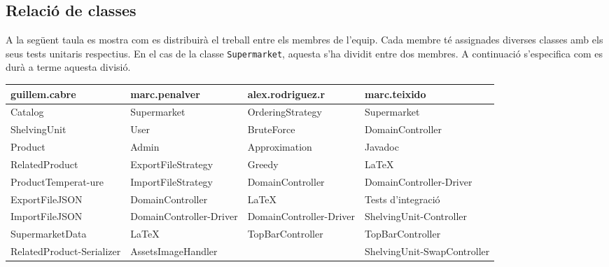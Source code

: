 \documentclass[a4paper,12pt]{report}
\begin{document}
\begin{itemize}
\section{Relació de classes}

A la següent taula es mostra com es distribuirà el treball entre els membres de l’equip. Cada membre té assignades diverses classes amb els seus tests unitaris respectius. En el cas de la classe \texttt{Supermarket}, aquesta s’ha dividit entre dos membres. A continuació s’especifica com es durà a terme aquesta divisió.

\begin{table}[H]
	\centering
	\setlength{\arrayrulewidth}{0.5mm}
	\setlength{\tabcolsep}{5pt}
	\renewcommand{\arraystretch}{1.5}
	\centering
		\begin{tabularx}{\textwidth}{|X|X|X|X|} %
			\hline
			\rowcolor{gray!40} %
			guillem.cabre            & marc.penalver      & alex.rodriguez.r & marc.teixido    \\
			\hline
			Catalog                  & Supermarket        & OrderingStrategy & Supermarket     \\
			\hline
			ShelvingUnit             & User               & BruteForce       & DomainController\\
			\hline
			Product                  & Admin              & Approximation    & Javadoc         \\
			\hline
			RelatedProduct           & ExportFileStrategy & Greedy           & \LaTeX          \\
			\hline
			ProductTemperat-\newline ure       & ImportFileStrategy & DomainController & DomainController-\newline Driver \\
			\hline
			ExportFileJSON           & DomainController   & \LaTeX           & Tests d'integració \\
			\hline
			ImportFileJSON           & DomainController-\newline Driver & DomainController-\newline Driver & ShelvingUnit-\newline Controller \\
			\hline
			SupermarketData          & \LaTeX & TopBarController &   TopBarController              \\
			\hline
			RelatedProduct-\newline Serializer & AssetsImageHandler                   &                 &   ShelvingUnit-\newline SwapController               \\

\end{tabularx}
\end{table}
\end{itemize}
\end{document}
